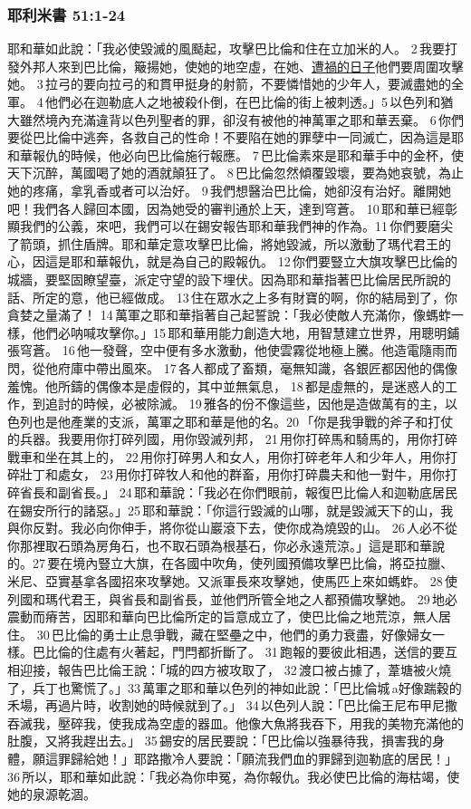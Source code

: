 \subsubsection{耶利米書 51:1-24}
耶和華如此說：「我必使毀滅的風颳起，攻擊巴比倫和住在立加米的人。 2 我要打發外邦人來到巴比倫，簸揚她，使她的地空虛，在她、\underline{遭禍的日子}他們要周圍攻擊她。 3 拉弓的要向拉弓的和貫甲挺身的射箭，不要憐惜她的少年人，要滅盡她的全軍。 4 他們必在迦勒底人之地被殺仆倒，在巴比倫的街上被刺透。」5 以色列和猶大雖然境內充滿違背以色列聖者的罪，卻沒有被他的神萬軍之耶和華丟棄。 6 你們要從巴比倫中逃奔，各救自己的性命！不要陷在她的罪孽中一同滅亡，因為這是耶和華報仇的時候，他必向巴比倫施行報應。 7 巴比倫素來是耶和華手中的金杯，使天下沉醉，萬國喝了她的酒就顛狂了。 8 巴比倫忽然傾覆毀壞，要為她哀號，為止她的疼痛，拿乳香或者可以治好。 9 我們想醫治巴比倫，她卻沒有治好。離開她吧！我們各人歸回本國，因為她受的審判通於上天，達到穹蒼。 10 耶和華已經彰顯我們的公義，來吧，我們可以在錫安報告耶和華我們神的作為。11 你們要磨尖了箭頭，抓住盾牌。耶和華定意攻擊巴比倫，將她毀滅，所以激動了瑪代君王的心，因這是耶和華報仇，就是為自己的殿報仇。 12 你們要豎立大旗攻擊巴比倫的城牆，要堅固瞭望臺，派定守望的設下埋伏。因為耶和華指著巴比倫居民所說的話、所定的意，他已經做成。 13 住在眾水之上多有財寶的啊，你的結局到了，你貪婪之量滿了！ 14 萬軍之耶和華指著自己起誓說：「我必使敵人充滿你，像螞蚱一樣，他們必呐喊攻擊你。」15 耶和華用能力創造大地，用智慧建立世界，用聰明鋪張穹蒼。 16 他一發聲，空中便有多水激動，他使雲霧從地極上騰。他造電隨雨而閃，從他府庫中帶出風來。 17 各人都成了畜類，毫無知識，各銀匠都因他的偶像羞愧。他所鑄的偶像本是虛假的，其中並無氣息， 18 都是虛無的，是迷惑人的工作，到追討的時候，必被除滅。 19 雅各的份不像這些，因他是造做萬有的主，以色列也是他產業的支派，萬軍之耶和華是他的名。20 「你是我爭戰的斧子和打仗的兵器。我要用你打碎列國，用你毀滅列邦， 21 用你打碎馬和騎馬的，用你打碎戰車和坐在其上的， 22 用你打碎男人和女人，用你打碎老年人和少年人，用你打碎壯丁和處女， 23 用你打碎牧人和他的群畜，用你打碎農夫和他一對牛，用你打碎省長和副省長。」 24 耶和華說：「我必在你們眼前，報復巴比倫人和迦勒底居民在錫安所行的諸惡。」25 耶和華說：「你這行毀滅的山哪，就是毀滅天下的山，我與你反對。我必向你伸手，將你從山巖滾下去，使你成為燒毀的山。 26 人必不從你那裡取石頭為房角石，也不取石頭為根基石，你必永遠荒涼。」這是耶和華說的。27 要在境內豎立大旗，在各國中吹角，使列國預備攻擊巴比倫，將亞拉臘、米尼、亞實基拿各國招來攻擊她。又派軍長來攻擊她，使馬匹上來如螞蚱。 28 使列國和瑪代君王，與省長和副省長，並他們所管全地之人都預備攻擊她。 29 地必震動而瘠苦，因耶和華向巴比倫所定的旨意成立了，使巴比倫之地荒涼，無人居住。 30 巴比倫的勇士止息爭戰，藏在堅壘之中，他們的勇力衰盡，好像婦女一樣。巴比倫的住處有火著起，門閂都折斷了。 31 跑報的要彼此相遇，送信的要互相迎接，報告巴比倫王說：「城的四方被攻取了， 32 渡口被占據了，葦塘被火燒了，兵丁也驚慌了。」33 萬軍之耶和華以色列的神如此說：「巴比倫城 a好像踹穀的禾場，再過片時，收割她的時候就到了。」 34 以色列人說：「巴比倫王尼布甲尼撒吞滅我，壓碎我，使我成為空虛的器皿。他像大魚將我吞下，用我的美物充滿他的肚腹，又將我趕出去。」 35 錫安的居民要說：「巴比倫以強暴待我，損害我的身體，願這罪歸給她！」耶路撒冷人要說：「願流我們血的罪歸到迦勒底的居民！」 36 所以，耶和華如此說：「我必為你申冤，為你報仇。我必使巴比倫的海枯竭，使她的泉源乾涸。 